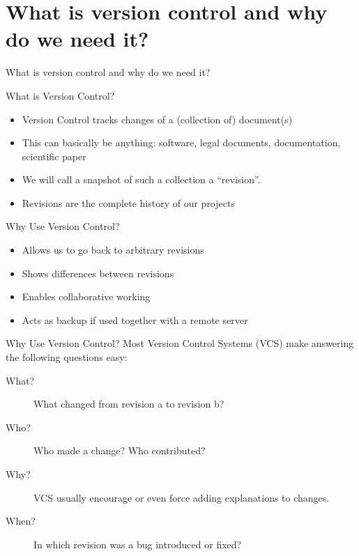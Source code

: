 \section{What is version control and why do we need it?}

\begin{frame}[c]%
  \begin{center}%
    \Huge\color{vertexDarkRed}What is version control and why do we need it?%
  \end{center}%
\end{frame}%


\begin{frame}[c]{What is Version Control?}
  \begin{itemize}
    \item Version Control tracks changes of a (collection of) document(s)
    \item This can basically be anything: software, legal documents, documentation, scientific paper
    \item We will call a snapshot of such a collection a \enquote{revision}.
    \item Revisions are the complete history of our projects
  \end{itemize}
\end{frame}

\begin{frame}[c]{Why Use Version Control?}
  \begin{itemize}
    \item Allows us to go back to arbitrary revisions
    \item Shows differences between revisions
    \item Enables collaborative working
    \item Acts as backup if used together with a remote server
  \end{itemize}
\end{frame}

\begin{frame}[c]{Why Use Version Control?}
  Most Version Control Systems (VCS) make answering the following questions easy:
  \begin{description}
    \item[What?] What changed from revision a to revision b?
    \item[Who?] Who made a change? Who contributed?
    \item[Why?] VCS usually encourage or even force adding explanations to changes.
    \item[When?] In which revision was a bug introduced or fixed?
  \end{description}

\end{frame}
